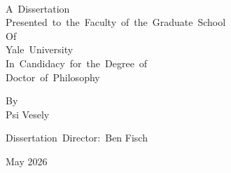 \begin{titlepage}
	\begin{center}
		
		\disstitle \\
		\par\vfill
		A~Dissertation\\
		Presented~to~the~Faculty~of~the~Graduate~School\\
		Of\\
		Yale~University\\
		In~Candidacy~for~the~Degree~of\\
		Doctor~of~Philosophy
		\par\vfill
		By\\
		Psi Vesely
		\par\vspace{1.5em}
		Dissertation~Director:~Ben Fisch
		\par\vspace{1.5em}
		May 2026
		\vspace*{1cm}
		
%		
%		
%		
%		
%		
%		
%		
		
	\end{center}
\end{titlepage}